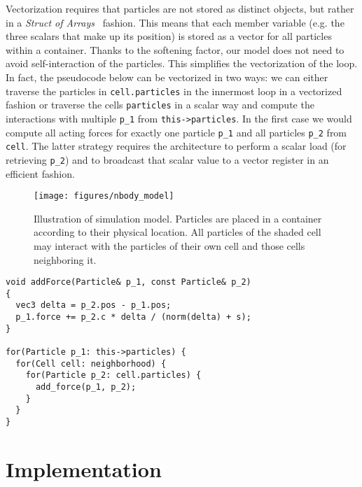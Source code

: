 \documentclass{sig-alternate}
\newcommand{\ctype}[1]{\texttt{{{#1}}}}
\newcommand{\cvar}[1]{\texttt{{{#1}}}}
\newcommand{\upp}{\vspace*{-0.5em}}
\newcommand{\up}{\vspace*{-0.25em}}
\begin{document}
Vectorization requires that particles are not stored as distinct
objects, but rather in a \emph{Struct of Arrays}~\cite{zeroOverhead}
fashion. This means that each member variable (e.g. the three scalars
that make up its position) is stored as a vector for all particles
within a container. Thanks to the softening factor, our model does not
need to avoid self-interaction of the particles. This simplifies the
vectorization of the loop. In fact, the pseudocode below can be
vectorized in two ways: we can either traverse the particles in
\cvar{cell.particles} in the innermost loop in a vectorized fashion
or traverse the cells \cvar{particles} in a scalar way
and compute the interactions with multiple \cvar{p\_1} from
\ctype{this->particles}.
In the first case we would compute all acting forces for exactly one
particle \cvar{p\_1} and all particles \cvar{p\_2} from \cvar{cell}.
 The latter strategy requires the architecture
to perform a scalar load (for retrieving \cvar{p\_2}) and to broadcast
that scalar value to a vector register in an efficient fashion.
\vspace*{2em}

\begin{figure}
  \centering

  \texttt{[image: figures/nbody\_model]}

    \upp
  \caption{Illustration of simulation model. Particles are placed in a
    container according to their physical location. All particles of
    the shaded cell may interact with the particles of their own cell
    and those cells neighboring it.}
  \upp\upp
\upp
  \label{fig:nbodymodel}
\end{figure}

\begin{lstlisting}
void addForce(Particle& p_1, const Particle& p_2)
{
  vec3 delta = p_2.pos - p_1.pos;
  p_1.force += p_2.c * delta / (norm(delta) + s);
}

for(Particle p_1: this->particles) {
  for(Cell cell: neighborhood) {
    for(Particle p_2: cell.particles) {
      add_force(p_1, p_2);
    }
  }
}
\end{lstlisting}

\section{Implementation}
\label{sec:implementation}

\end{document}
